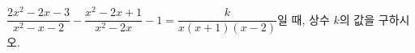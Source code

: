 \hspace*{2mm}\begin{minipage}[t]{\dimexpr\linewidth-2mm\relax}\vspace{0pt}
$\dfrac{2x^2-2x-3}{x^2-x-2}-\dfrac{x^2-2x+1}{x^2-2x}-1=\dfrac{k}{x(x+1)(x-2)}$일 때, 상수 $k$의 값을 구하시오.\end{minipage}
